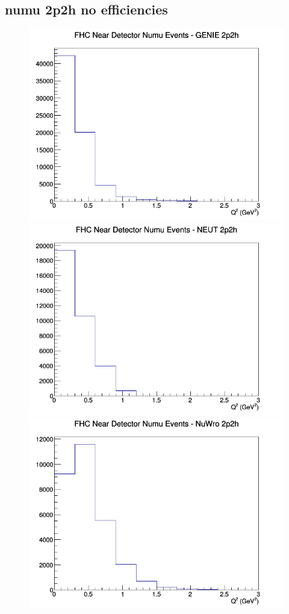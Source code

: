 \documentclass[12pt]{article}
\begin{document}
\subsection{numu 2p2h no efficiencies}
\begin{figure}[h]
\includegraphics[width=\linewidth]{Q2/nominal/2p2h_FHC_ND_numu_Q2_GENIE.png}
\endminipage
{}
\includegraphics[width=\linewidth]{Q2/nominal/2p2h_FHC_ND_numu_Q2_NEUT.png}
\endminipage
{}
\includegraphics[width=\linewidth]{Q2/nominal/2p2h_FHC_ND_numu_Q2_NuWro.png}

\end{figure}
\end{document}
